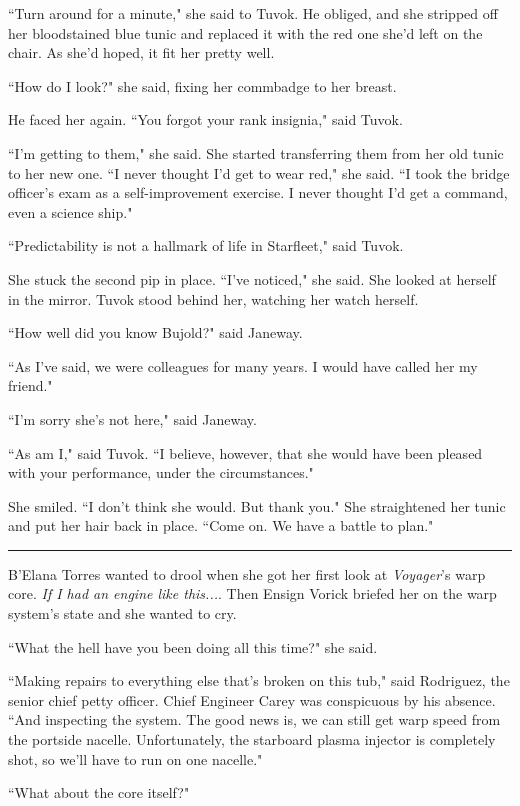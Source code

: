 \documentclass[twoside,letterpaper,12pt]{memoir}
\begin{document}
``Turn around for a minute," she said to Tuvok. He obliged, and she stripped off her bloodstained blue tunic and replaced it with the red one she'd left on the chair. As she'd hoped, it fit her pretty well.

``How do I look?" she said, fixing her commbadge to her breast.

He faced her again. ``You forgot your rank insignia," said Tuvok.

``I'm getting to them," she said. She started transferring them from her old tunic to her new one. ``I never thought I'd get to wear red," she said. ``I took the bridge officer's exam as a self-improvement exercise. I never thought I'd get a command, even a science ship."

``Predictability is not a hallmark of life in Starfleet," said Tuvok.

She stuck the second pip in place. ``I've noticed," she said. She looked at herself in the mirror. Tuvok stood behind her, watching her watch herself.

``How well did you know Bujold?" said Janeway.

``As I've said, we were colleagues for many years. I would have called her my friend."

``I'm sorry she's not here," said Janeway.

``As am I," said Tuvok. ``I believe, however, that she would have been pleased with your performance, under the circumstances."

She smiled. ``I don't think she would. But thank you." She straightened her tunic and put her hair back in place. ``Come on. We have a battle to plan."

\fancybreak{\rule{3cm}{0.4 pt}}
B'Elana Torres wanted to drool when she got her first look at \textit{Voyager}'s warp core. \textit{If I had an engine like this...}. Then Ensign Vorick briefed her on the warp system's state and she wanted to cry.

``What the hell have you been doing all this time?" she said.

``Making repairs to everything else that's broken on this tub," said Rodriguez, the senior chief petty officer. Chief Engineer Carey was conspicuous by his absence. ``And inspecting the system. The good news is, we can still get warp speed from the portside nacelle. Unfortunately, the starboard plasma injector is completely shot, so we'll have to run on one nacelle."

``What about the core itself?"
\end{document}
